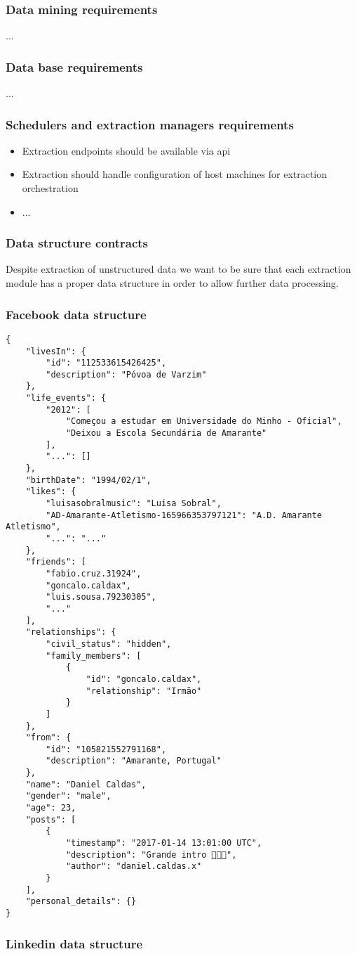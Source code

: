 \subsubsection{Data mining requirements}
...

\subsubsection{Data base requirements}
...

\subsubsection{Schedulers and extraction managers requirements}
\begin{itemize}
    \item Extraction endpoints should be available via api
    \item Extraction should handle configuration of host machines for extraction orchestration
    \item ...
\end{itemize}

\subsubsection{Data structure contracts}
Despite extraction of unstructured data we want to be sure that each extraction module has a proper data structure in order to allow
further data processing.

\subsubsection*{Facebook data structure}
\begin{verbatim}
{
    "livesIn": {
        "id": "112533615426425",
        "description": "Póvoa de Varzim"
    },
    "life_events": {
        "2012": [
            "Começou a estudar em Universidade do Minho - Oficial",
            "Deixou a Escola Secundária de Amarante"
        ],
        "...": []
    },
    "birthDate": "1994/02/1",
    "likes": {
        "luisasobralmusic": "Luisa Sobral",
        "AD-Amarante-Atletismo-165966353797121": "A.D. Amarante Atletismo",
        "...": "..."
    },
    "friends": [
        "fabio.cruz.31924",
        "goncalo.caldax",
        "luis.sousa.79230305",
        "..."
    ],
    "relationships": {
        "civil_status": "hidden",
        "family_members": [
            {
                "id": "goncalo.caldax",
                "relationship": "Irmão"
            }
        ]
    },
    "from": {
        "id": "105821552791168",
        "description": "Amarante, Portugal"
    },
    "name": "Daniel Caldas",
    "gender": "male",
    "age": 23,
    "posts": [
        {
            "timestamp": "2017-01-14 13:01:00 UTC",
            "description": "Grande intro 🎸🎸🎸",
            "author": "daniel.caldas.x"
        }
    ],
    "personal_details": {}
}
\end{verbatim}

\subsubsection*{Linkedin data structure}
